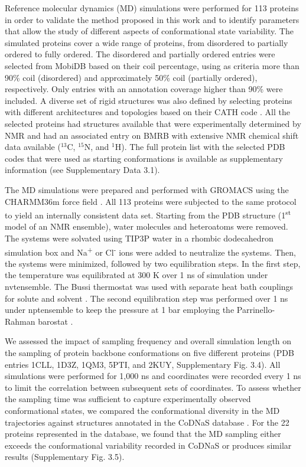 Reference molecular dynamics (MD) simulations were performed for 113 proteins in order to validate the method proposed in this work and to identify parameters that allow the study of different aspects of conformational state variability. The simulated proteins cover a wide range of proteins, from disordered to partially ordered to fully ordered. The disordered and partially ordered entries were selected from MobiDB \cite{piovesan_mobidb_2020} based on their coil percentage, using as criteria more than 90\% coil (disordered) and approximately 50\% coil (partially ordered), respectively. Only entries with an annotation coverage higher than 90\% were included. A diverse set of rigid structures was also defined by selecting proteins with different architectures and topologies based on their CATH code \cite{sillitoe_cath_2021}. All the selected proteins had structures available that were experimentally determined by NMR and had an associated entry on BMRB with extensive NMR chemical shift data  available ($^{13}$C,  $^{15}$N, and $^1$H). The full protein list with the selected PDB codes that were used as starting conformations is available as supplementary information (see Supplementary Data 3.1).

The MD simulations were prepared and performed with GROMACS \cite{van_der_spoel_gromacs_2005} using the CHARMM36m force field \cite{huang_charmm36m_2017}. All 113 proteins were subjected to the same protocol to yield an internally consistent data set. Starting from the PDB structure (1\textsuperscript{st} model of an NMR ensemble), water molecules and heteroatoms were removed. The systems were solvated using TIP3P water \cite{10.1063/1.445869} in a rhombic dodecahedron simulation box and Na\textsuperscript{+} or Cl\textsuperscript{-} ions were added to neutralize the systems. Then, the systems were minimized, followed by two equilibration steps. In the first step, the temperature was equilibrated at 300 K over 1 ns of simulation under \gls{nvtensemble}. The Bussi thermostat was used with separate heat bath couplings for solute and solvent \cite{bussi_canonical_2007}. The second equilibration step was performed over 1 ns under \gls{nptensemble} to keep the pressure at 1 bar employing the Parrinello-Rahman barostat \cite{parrinello_polymorphic_1981}. 

We assessed the impact of sampling frequency and overall simulation length on the sampling of protein backbone conformations on five different proteins (PDB entries 1CLL, 1D3Z, 1QM3, 5PTI, and 2KUY, Supplementary Fig. 3.4).
All simulations were performed for 1,000 ns and coordinates were recorded every 1 ns to limit the correlation between subsequent sets of coordinates. To assess whether the sampling time was sufficient to capture experimentally observed conformational states, we compared the conformational diversity in the MD trajectories against structures annotated in the CoDNaS database \cite{monzon_codnas_2016}. For the 22 proteins represented in the database, we found that the MD sampling either exceeds the conformational variability recorded in CoDNaS or produces similar results (Supplementary Fig. 3.5).

